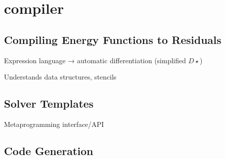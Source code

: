 \section{compiler}
\label{sec:compiler}

\subsection{Compiling Energy Functions to Residuals} %
\label{sub:autodiff}

Expression language → automatic differentiation (simplified $D\star$)

Understands data structures, stencils


\subsection{Solver Templates} %
\label{sub:solver_templates}
Metaprogramming interface/API

\subsection{Code Generation} %
\label{sub:codegen}

